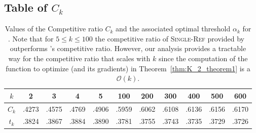\subsection{Table of $C_k$}

\begin{table}[]
    \centering
    \caption{Values of the Competitive ratio $C_k$ and the associated optimal threshold $\alpha_k$ for \algoname. Note that for $5\leq k\leq 100$ the competitive ratio of \textsc{Single-Ref} provided by~\citet{albers2020new} outperforms \algoname's competitive ratio. However, our analysis provides a tractable way for the competitive ratio that scales with $k$ since the computation of the function to optimize (and its gradients) in Theorem~\ref{thm:K_2_theorem1} is a $\mathcal{O}(k)$.}
    \vspace{2pt}
    \begin{tabular}{ccccccccccc}
     \toprule
          $k$ & 2 &3 & 4 & 5 & 100 & 200 &300 &400 & 500 & 600\\
         \midrule
        $C_k$ & .4273&.4575&.4769&.4906&.5959&.6062&.6108&.6136&.6156&.6170 \\
        $t_k$ & .3824 &.3867&.3884&.3890&.3781 &.3755 &.3743&.3735&.3729&.3726 \\
        \bottomrule
    \end{tabular}
    \label{tab:C_k}
\end{table}